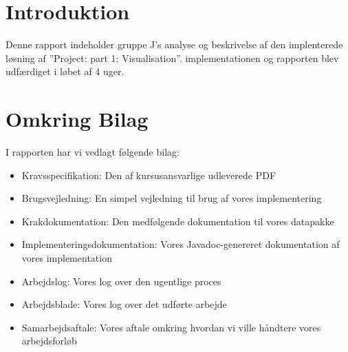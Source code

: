 \section{Introduktion}
Denne rapport indeholder gruppe J's analyse og beskrivelse af den implenterede løsning af ''Project: part 1: Visualisation''. implementationen og rapporten blev udfærdiget i løbet af 4 uger.
\section{Omkring Bilag}
I rapporten har vi vedlagt følgende bilag:
\begin{itemize}
\item{Kravsspecifikation: Den af kursusansvarlige udleverede PDF}
\item{Brugsvejledning: En simpel vejledning til brug af vores implementering}
\item{Krakdokumentation: Den medfølgende dokumentation til vores datapakke}
\item{Implementeringsdokumentation: Vores Javadoc-genereret dokumentation af vores implementation}
\item{Arbejdslog: Vores log over den ugentlige proces}
\item{Arbejdsblade: Vores log over det udførte arbejde}
\item{Samarbejdsaftale: Vores aftale omkring hvordan vi ville håndtere vores arbejdsforløb}
\end{itemize}

